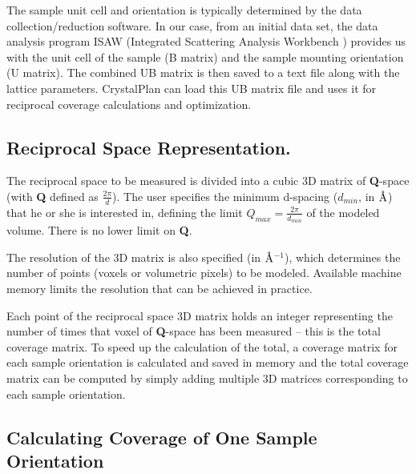 \documentclass[final]{iucr}              %
\newcommand{\ang}{$\mathrm{\AA} $}
\begin{document}
The sample unit cell and orientation is typically determined by the data
collection/reduction software. In our case, from an initial data set, the data
analysis program ISAW (Integrated Scattering Analysis
Workbench \cite{Mikkelson05}) provides us with the unit cell of the sample (B
matrix) and the sample mounting orientation (U matrix).
The combined UB matrix is then saved to a
text file along with the lattice parameters. 
CrystalPlan can load this UB matrix file and uses it for reciprocal coverage
calculations and optimization.
    
  
\subsection{Reciprocal Space Representation.}

The reciprocal space to be measured is divided into a cubic 3D matrix 
of {\bf Q}-space (with {\bf Q} defined as $\frac{2\pi}{d}$). 
The user specifies the minimum d-spacing ($d_{min}$, in \ang) 
that he or she is interested in, defining the limit
$Q_{max} = \frac{2\pi}{d_{min}}$ of the modeled volume. There is no lower limit
on {\bf Q}.

The resolution of the 3D matrix is also specified
(in \ang$^{-1}$), which determines the number of points (voxels or volumetric pixels) to be modeled. Available machine memory
limits the resolution that can be achieved in practice.

Each point of the reciprocal space 3D matrix holds an integer representing the 
number of times that voxel of {\bf Q}-space has
been measured -- this is the total coverage matrix. To speed up the
calculation of the total, a coverage matrix for each sample orientation is 
calculated and saved in memory and the total coverage
matrix can be computed by simply adding multiple 3D matrices corresponding to each sample orientation. 
 
\subsection{Calculating Coverage of One Sample Orientation}
\end{document}

